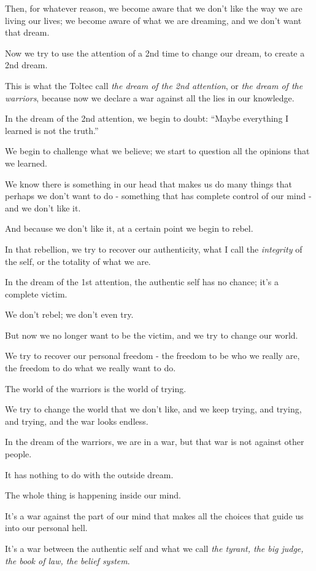 \documentclass{article}
\numberwithin{equation}{section}
\begin{document}
Then, for whatever reason, we become aware that we don't like the way we are living our lives; we become aware of what we are dreaming, and we don't want that dream.

Now we try to use the attention of a 2nd time to change our dream, to create a 2nd dream.

This is what the Toltec call \textit{the dream of the 2nd attention}, or \textit{the dream of the warriors}, because now we declare a war against all the lies in our knowledge.

%
In the dream of the 2nd attention, we begin to doubt: ``Maybe everything I learned is not the truth.''

We begin to challenge what we believe; we start to question all the opinions that we learned.

We know there is something in our head that makes us do many things that perhaps we don't want to do - something that has complete control of our mind - and we don't like it.

And because we don't like it, at a certain point we begin to rebel.

%
In that rebellion, we try to recover our authenticity, what I call the \textit{integrity} of the self, or the totality of what we are.

In the dream of the 1st attention, the authentic self has no chance; it's a complete victim.

We don't rebel; we don't even try.

But now we no longer want to be the victim, and we try to change our world.

We try to recover our personal freedom - the freedom to be who we really are, the freedom to do what we really want to do.

The world of the warriors is the world of trying.

We try to change the world that we don't like, and we keep trying, and trying, and trying, and the war looks endless.

%
In the dream of the warriors, we are in a war, but that war is not against other people.

It has nothing to do with the outside dream.

The whole thing is happening inside our mind.

It's a war against the part of our mind that makes all the choices that guide us into our personal hell.

It's a war between the authentic self and what we call \textit{the tyrant, the big judge, the book of law, the belief system}.
\end{document}
